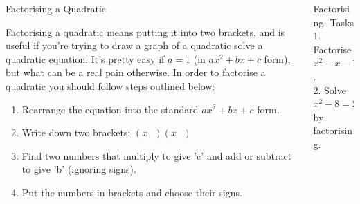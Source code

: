 \documentclass[final]{beamer}
\newlength{\onecolwid}
\newlength{\twocolwid}
\begin{document}
\begin{frame}[t]
\begin{columns}[t]
\begin{column}{\twocolwid}
\begin{columns}[t,totalwidth=\twocolwid]
\begin{column}{\onecolwid}\vspace{-.6in} %


\begin{block}{Factorising a Quadratic}

Factorising a quadratic means putting it into two brackets, and is useful if you're trying to draw a graph of a quadratic solve a quadratic equation. It's pretty easy if $a=1$ (in $ax^2+bx+c$ form), but what can be a real pain otherwise.
\newline
\newline
In order to factorise a quadratic you should follow steps outlined below:

\begin{enumerate}
\item Rearrange the equation into the standard $ax^2+bx+c$ form.
\item Write down two brackets: $(x\ \ \ )(x\ \ \ )$
\item Find two numbers that multiply to give 'c' and add or subtract to give 'b' (ignoring signs).
\item Put the numbers in brackets and choose their signs.
\end{enumerate}

\end{block}


\end{column} %

\begin{column}{\onecolwid}\vspace{-.6in} %


\begin{block}{Factorising- Tasks}
1. Factorise $x^2-x-12$.
\[\]
\[\]
\[\]
\[\]
2. Solve $x^2-8=2x$ by factorising.

\end{block}


\end{column}
\end{columns}
\end{column}
\end{columns}
\end{frame}
\end{document}
